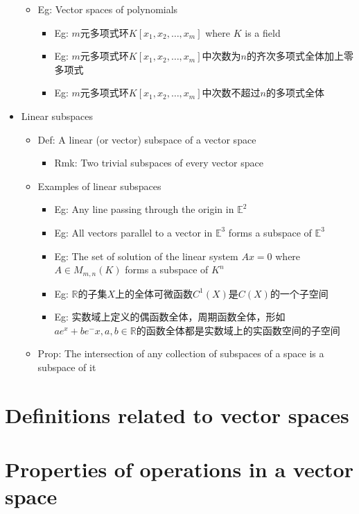 \documentclass[onecolumn]{ctexart}
\begin{document}
\begin{itemize}
\begin{itemize}
\begin{itemize}
    \end{itemize}
    \item Eg: Vector spaces of polynomials
    \begin{itemize}
      \item Eg: $m$元多项式环$K[x_1, x_2, \ldots, x_m]$ where $K$ is a field
      \item Eg: $m$元多项式环$K[x_1, x_2, \ldots, x_m]$中次数为$n$的齐次多项式全体加上零多项式
      \item Eg: $m$元多项式环$K[x_1, x_2, \ldots, x_m]$中次数不超过$n$的多项式全体
    \end{itemize}
  \end{itemize}
  \item Linear subspaces
  \begin{itemize}
    \item Def: A linear (or vector) subspace of a vector space
    \begin{itemize}
      \item Rmk: Two trivial subspaces of every vector space
    \end{itemize}
    \item Examples of linear subspaces
    \begin{itemize}
      \item Eg: Any line passing through the origin in $\mathbb{E}^2$
      \item Eg: All vectors parallel to a vector in $\mathbb{E}^3$ forms a subspace of $\mathbb{E}^3$
      \item Eg: The set of solution of the linear system $Ax = 0$ where $A \in M_{m,n}(K)$ forms a subspace of $K^n$
      \item Eg: $\mathbb{R}$的子集$X$上的全体可微函数$C^1(X)$是$C(X)$的一个子空间
      \item Eg: 实数域上定义的偶函数全体，周期函数全体，形如$ae^x + be^-x, a,b \in \mathbb{R}$的函数全体都是实数域上的实函数空间的子空间
    \end{itemize}
    \item Prop: The intersection of any collection of subspaces of a space is a subspace of it
  \end{itemize}
\end{itemize}

\section{Definitions related to vector spaces}

\section{Properties of operations in a vector space}
\end{document}
